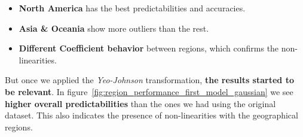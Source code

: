 \documentclass[11pt,english,a4paper,hidelinks]{book}
\begin{document}
\begin{itemize}
    \item \textbf{North America} has the best predictabilities and accuracies.
    \item \textbf{Asia \& Oceania} show more outliers than the rest.
    \item \textbf{Different Coefficient behavior} between regions, which confirms the non-linearities.
\end{itemize}

\noindent But once we applied the \textit{Yeo-Johnson} transformation, \textbf{the results started to be relevant}. In figure~\ref{fig:region_performance_first_model_gaussian} we see \textbf{higher overall predictabilities}  than the ones we had using the original dataset. This also indicates the presence of non-linearities with the geographical regions.
\end{document}
